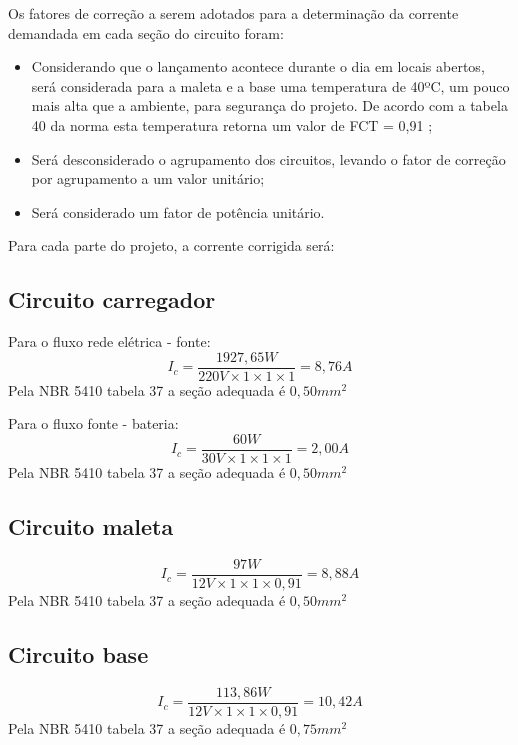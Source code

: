 \par Os fatores de correção a serem adotados para a determinação da corrente demandada em cada seção do circuito foram:

\begin{itemize}
    \item Considerando que o lançamento acontece durante o dia em locais abertos, será considerada para a maleta e a base uma temperatura de 40ºC, um pouco mais alta que a ambiente, para segurança do projeto. De acordo com a tabela 40 da norma esta temperatura retorna um valor de FCT = 0,91 ;
    \item Será desconsiderado o agrupamento dos circuitos, levando o fator de correção por agrupamento a um valor unitário; 
    \item Será considerado um fator de potência unitário.
\end{itemize}


\par Para cada parte do projeto, a corrente corrigida será:

\subsection{Circuito carregador}
    Para o fluxo rede elétrica - fonte:
\begin{equation}
    I_{c} = \frac{1927,65W}{220V \times 1 \times 1 \times 1} = 8,76A
\end{equation}
Pela NBR 5410 tabela 37 a seção adequada é $0,50mm^2$

    Para o fluxo fonte - bateria:
\begin{equation}
    I_{c} = \frac{60W}{30V \times 1 \times 1 \times 1} = 2,00A
\end{equation}
Pela NBR 5410 tabela 37 a seção adequada é $0,50mm^2$  

\subsection {Circuito maleta}
  \begin{equation}
    I_{c} = \frac{97W}{12V \times 1 \times 1 \times 0,91} = 8,88A
\end{equation}
Pela NBR 5410 tabela 37 a seção adequada é $0,50mm^2$ 

\subsection {Circuito base}
  \begin{equation}
    I_{c} = \frac{113,86W}{12V \times 1 \times 1 \times 0,91} = 10,42A
\end{equation}
Pela NBR 5410 tabela 37 a seção adequada é $0,75mm^2$ 



